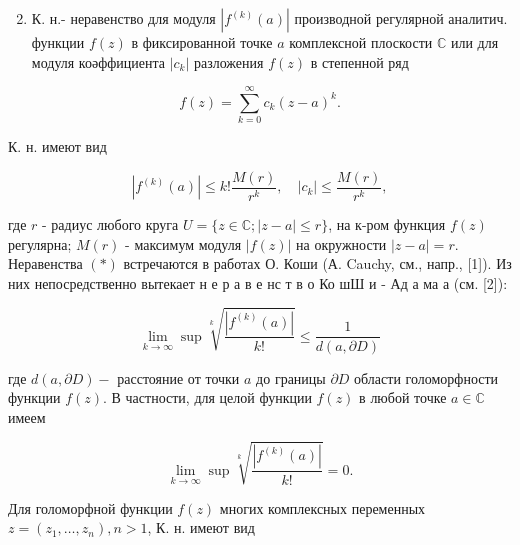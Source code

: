 \documentclass[10pt]{article}
\begin{document}
\begin{enumerate}

  \setcounter{enumi}{1}

  \item К. н.- неравенство для модуля $\left|f^{(k)}(a)\right|$ производной регулярной аналитич. функции $f(z)$ в фиксированной точке $a$ комплексной плоскости $\mathbb{C}$ или для модуля коәффициента $\left|c_{k}\right|$ разложения $f(z)$ в степенной ряд

\end{enumerate}



\[

f(z)=\sum_{k=0}^{\infty} c_{k}(z-a)^{k} .

\]



К. н. имеют вид



\[

\left|f^{(k)}(a)\right| \leqslant k ! \frac{M(r)}{r^{k}}, \quad\left|c_{k}\right| \leqslant \frac{M(r)}{r^{k}},

\]



где $r$ - радиус любого круга $U=\{z \in \mathbb{C} ;|z-a| \leqslant r\}$, на к-ром функция $f(z)$ регулярна; $M(r)$ - максимум модуля $|f(z)|$ на окружности $|z-a|=r$. Неравенства $(*)$ встречаются в работах О. Коши (А. Cauchy, см., напр., [1]). Из них непосредственно вытекает н е р а в е нс т в о Ко шШ и - Ад а ма а (см. [2]):



\[

\lim _{k \rightarrow \infty} \sup \sqrt[k]{\frac{\left|f^{(k)}(a)\right|}{k !}} \leqslant \frac{1}{d(a, \partial D)}

\]



где $d(a, \partial D)-$ расстояние от точки $a$ до границы $\partial D$ области голоморфности функции $f(z)$. В частности, для целой функции $f(z)$ в любой точке $a \in \mathbb{C}$ имеем



\[

\lim _{k \rightarrow \infty} \sup \sqrt[k]{\frac{\left|f^{(k)}(a)\right|}{k !}}=0 .

\]



Для голоморфной функции $f(z)$ многих комплексных переменных $z=\left(z_{1}, \ldots, z_{n}\right), n>1$, К. н. имеют вид
\end{document}

